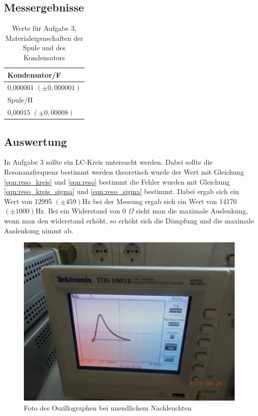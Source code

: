 \documentclass[12pt]{scrartcl}
\begin{document}
\subsection{Messergebnisse}

\begin{table}[htbp]
\caption{Werte für Aufgabe 3, Materialeigenschaften der Spule und des Kondensators}
\begin{center}
\begin{tabular}{|l|}
\hline
Kondensator/F \\ \hline
0,000001 $(\pm  0,000001)$ \\ \hline
Spule/H \\ \hline
0,00015 $(\pm 0,00008)$ \\ \hline
\end{tabular}
\end{center}
\label{tab:3}
\end{table}
\subsection{Auswertung}

In Aufgabe 3 sollte ein LC-Kreis untersucht werden. Dabei sollte die Resonanzfrequenz bestimmt werden theoretisch wurde der Wert mit Gleichung \ref{eqn:reso_kreis} und \ref{eqn:reso} bestimmt die Fehler wurden mit Gleichung \ref{eqn:reso_kreis_sigma} und \ref{eqn:reso_sigma} bestimmt.
Dabei ergab sich ein Wert von 12995 $(\pm 459)$Hz bei der Messung ergab sich ein Wert von 14170 $(\pm 1000)$Hz. Bei ein Widerstand von 0 $\Omega$ sieht man die maximale Auslenkung, wenn man den widerstand erhöht, so erhöht sich die Dämpfung und die maximale Auslenkung nimmt ab.

\begin{figure}[htbp] 
  \centering
    \includegraphics[scale = 0.2]{aufgabe3_2.JPG}
  	\caption[Foto des Oszillographen bei unendlichem Nachleuchten]{Foto des Oszillographen bei unendlichem Nachleuchten}
  \label{fig:teil_6}
\end{figure}
\end{document}
